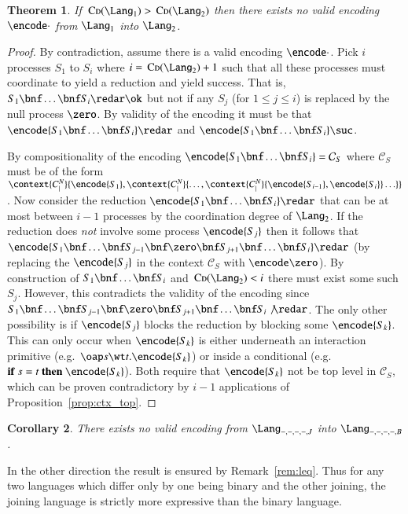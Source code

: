 \documentclass[submission,copyright,creativecommons]{eptcs}
\newtheorem{theorem}{Theorem}[section]
\newtheorem{corollary}[theorem]{Corollary}
\newcommand{\ift}[3]{{\bf if}\ #1=#2\ {\bf then}\ #3}
\newcommand{\cood}[1]{\,\mbox{\sc Cd}(#1)}
\begin{document}
\begin{theorem}\label{thm:int_deg_gt}
If $\cood{\Lang_1}>\cood{\Lang_2}$ then there exists no valid encoding $\encode\cdot$ from $\Lang_1$ into $\Lang_2$.
\end{theorem}
\begin{proof}
By contradiction, assume there is a valid encoding $\encode\cdot$.
Pick $i$ processes $S_1$ to $S_i$ where $i=\cood{\Lang_2}+1$ such that all these processes
must coordinate to yield a reduction and yield success.
That is, $S_1\bnf \ldots \bnf S_i\redar\ok$
but not if any $S_j$ (for $1\leq j\leq i$) is replaced by the null process $\zero$.
By validity of the encoding it must be that $\encode{S_1\bnf \ldots \bnf S_i}\redar$
and $\encode{S_1\bnf \ldots \bnf S_i}\suc$.

By compositionality of the encoding 
$\encode{S_1\bnf \ldots \bnf S_i}=\mathcal{C}_S$ where
$\mathcal{C}_S$ must be of the form\linebreak
$\context{C^N_|}{\encode{S_1},\context{C^N_|}{\ldots,\context{C^N_|}{\encode{S_{i-1}},\encode{S_i}}\ldots}}$.
Now consider the reduction $\encode{S_1\bnf \ldots \bnf S_i}\redar$ that can be at most between $i-1$
processes by the coordination degree of $\Lang_2$.
If the reduction does {\em not} involve some process $\encode {S_j}$ then it follows that
$\encode{S_1\bnf\ldots\bnf S_{j-1}\bnf\zero\bnf S_{j+1}\bnf\ldots\bnf S_i}\redar$
(by replacing the $\encode{S_j}$ in the context $\mathcal{C}_S$ with $\encode\zero$).
By construction of $S_1\bnf \ldots\bnf S_i$ and $\cood{\Lang_2}<i$ there must
exist some such $S_j$.
However, this contradicts the validity of the encoding since
$S_1\bnf\ldots\bnf S_{j-1}\bnf\zero\bnf S_{j+1}\bnf\ldots\bnf S_i\not\redar$.
The only other possibility is if $\encode{S_j}$ blocks the reduction by blocking some $\encode{S_k}$.
This can only occur when $\encode{S_k}$ is either underneath an interaction primitive
(e.g.~$\oap s {\wt t}.\encode{S_k}$) or inside a conditional (e.g.~$\ift s t {\encode{S_k}}$).
Both require that $\encode{S_k}$ not be top level in $\mathcal{C}_S$, which can be proven contradictory
by $i-1$ applications of Proposition~\ref{prop:ctx_top}.
\end{proof}

\begin{corollary}
\label{cor:join_gt_bin}
There exists no valid encoding from $\Lang_{-,-,-,-,J}$ into $\Lang_{-,-,-,-,B}$.
\end{corollary}

In the other direction the result is ensured by Remark~\ref{rem:leq}.
Thus for any two languages which differ only by one being binary and the other joining, the
joining language is strictly more expressive than the binary language.
\end{document}
